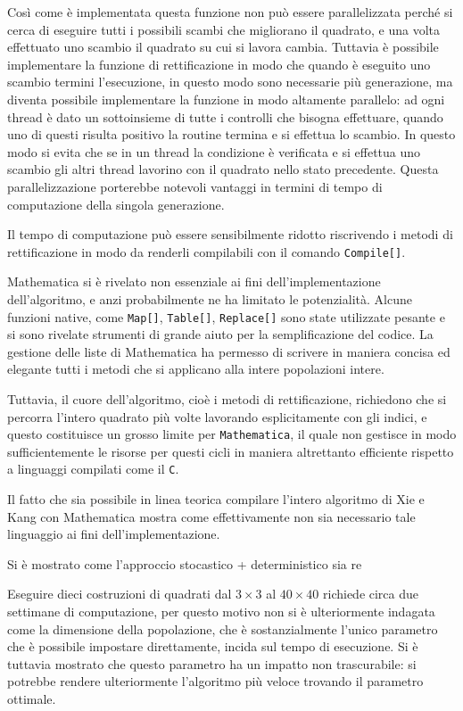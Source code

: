 \documentclass[italian,twoside,twocolumn]{article}
\begin{document}
Così come è implementata questa funzione non può essere parallelizzata perché si cerca di eseguire tutti i possibili scambi che migliorano il quadrato, e una volta effettuato uno scambio il quadrato su cui si lavora cambia. Tuttavia è possibile implementare la funzione di rettificazione in modo che quando è eseguito uno scambio termini l'esecuzione, in questo modo sono necessarie più generazione, ma diventa possibile implementare la funzione in modo altamente parallelo: ad ogni thread è dato un sottoinsieme di tutte i controlli che bisogna effettuare, quando uno di questi risulta positivo la routine termina e si effettua lo scambio. In questo modo si evita che se in un thread la condizione è verificata e si effettua uno scambio gli altri thread lavorino con il quadrato nello stato precedente. Questa parallelizzazione porterebbe notevoli vantaggi in termini di tempo di computazione della singola generazione.

Il tempo di computazione può essere sensibilmente ridotto riscrivendo i metodi di rettificazione in modo da renderli compilabili con il comando \texttt{Compile[]}.

Mathematica si è rivelato non essenziale ai fini dell'implementazione dell'algoritmo, e anzi probabilmente ne ha limitato le potenzialità. Alcune funzioni native, come \texttt{Map[]}, \texttt{Table[]}, \texttt{Replace[]} sono state utilizzate pesante e si sono rivelate strumenti di grande aiuto per la semplificazione del codice. La gestione delle liste di Mathematica ha permesso di scrivere in maniera concisa ed elegante tutti i metodi che si applicano alla intere popolazioni intere.

Tuttavia, il cuore dell'algoritmo, cioè i metodi di rettificazione, richiedono che si percorra l'intero quadrato più volte lavorando esplicitamente con gli indici, e questo costituisce un grosso limite per \texttt{Mathematica}, il quale non gestisce in modo sufficientemente le risorse per questi cicli in maniera altrettanto efficiente rispetto a linguaggi compilati come il \texttt{C}.

Il fatto che sia possibile in linea teorica compilare l'intero algoritmo di Xie e Kang con Mathematica mostra come effettivamente non sia necessario tale linguaggio ai fini dell'implementazione. 

Si è mostrato come l'approccio stocastico + deterministico sia re

Eseguire dieci costruzioni di quadrati dal $ 3\times 3 $ al $ 40\times40 $ richiede circa due settimane di computazione, per questo motivo non si è ulteriormente indagata come la dimensione della popolazione, che è sostanzialmente l'unico parametro che è possibile impostare direttamente, incida sul tempo di esecuzione. Si è tuttavia mostrato che questo parametro ha un impatto non trascurabile: si potrebbe rendere ulteriormente l'algoritmo più veloce trovando il parametro ottimale.
\end{document}
